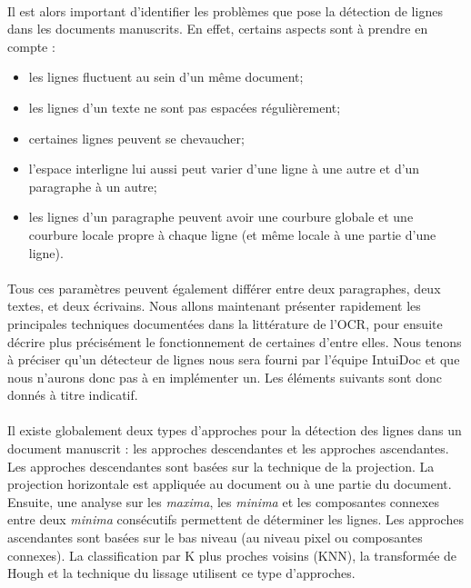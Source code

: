 \paragraph{}
Il est alors important d'identifier les problèmes que pose la détection de lignes dans les documents manuscrits.
En effet, certains aspects sont à prendre en compte :
\begin{itemize}
\item les lignes fluctuent au sein d'un même document;
\item les lignes d'un texte ne sont pas espacées régulièrement;
\item certaines lignes peuvent se chevaucher;
\item l'espace interligne lui aussi peut varier d'une ligne à une autre et d'un paragraphe à un autre;
\item les lignes d'un paragraphe peuvent avoir une courbure globale et une courbure locale propre à
chaque ligne (et même locale à une partie d'une ligne).
\end{itemize}

\paragraph{}
Tous ces paramètres peuvent également différer entre deux paragraphes, deux textes, et deux écrivains. Nous allons maintenant
présenter rapidement les principales techniques documentées dans la littérature de l'OCR, pour ensuite décrire plus
précisément le fonctionnement de certaines d'entre elles. Nous tenons à préciser qu’un détecteur de lignes nous sera fourni
par l’équipe IntuiDoc et que nous n’aurons donc pas à en implémenter un. Les éléments suivants sont donc donnés à titre indicatif.

\paragraph{}
Il existe globalement deux types d'approches pour la détection des lignes dans un document manuscrit : les approches
descendantes et les approches ascendantes. Les approches descendantes sont basées sur la technique de la projection.
La projection horizontale est appliquée au document ou à une partie du document. Ensuite, une analyse sur les \textit{maxima},
les \textit{minima} et les composantes connexes entre deux \textit{minima} consécutifs permettent de déterminer les lignes.
Les approches ascendantes sont basées sur le bas niveau (au niveau pixel ou composantes connexes). La classification
par K plus proches voisins (KNN), la transformée de Hough et la technique du lissage utilisent ce type d'approches.

